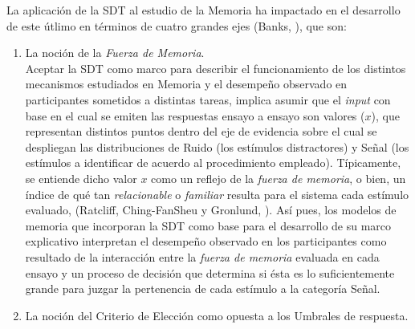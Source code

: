La aplicación de la SDT al estudio de la Memoria ha impactado en el desarrollo de este útlimo en términos de cuatro grandes ejes (Banks, \citeyear{Banks1970}), que son:\\

\begin{enumerate}
\item La noción de la \textit{Fuerza de Memoria}.\\

Aceptar la SDT como marco para describir el funcionamiento de los distintos mecanismos estudiados en Memoria y el desempeño observado en participantes sometidos a distintas tareas, implica asumir que el \textit{input} con base en el cual se emiten las respuestas ensayo a ensayo son valores ($x$), que representan distintos puntos dentro del eje de evidencia sobre el cual se despliegan las distribuciones de Ruido (los estímulos distractores) y Señal (los estímulos a identificar de acuerdo al procedimiento empleado). Típicamente, se entiende dicho valor $x$ como un reflejo de la \textit{fuerza de memoria}, o bien, un índice de qué tan \textit{relacionable} o \textit{familiar} resulta para el sistema cada estímulo evaluado, (Ratcliff, Ching-FanSheu y Gronlund, \citeyear{Ratcliff1992}). Así pues, los modelos de memoria que incorporan la SDT como base para el desarrollo de su marco explicativo interpretan el desempeño observado en los participantes como resultado de la interacción entre la \textit{fuerza de memoria} evaluada en cada ensayo y un proceso de decisión que determina si ésta es lo suficientemente grande para juzgar la pertenencia de cada estímulo a la categoría Señal.\\


\item La noción del Criterio de Elección como opuesta a los Umbrales de respuesta.\\


\end{enumerate}
